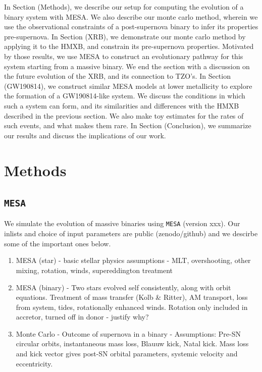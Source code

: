 \documentclass[linenumbers,trackchanges,twocolumn]{aastex701}
\begin{document}
In Section (Methods), we describe our setup for computing the evolution of a binary system with MESA. We also describe our monte carlo method, wherein we use the observational constraints of a post-supernova binary to infer its properties pre-supernova. In Section (XRB), we demonstrate our monte carlo method by applying it to the HMXB, and constrain its pre-supernova properties. Motivated by those results, we use MESA to construct an evolutionary pathway for this system starting from a massive binary. We end the section with a discussion on the future evolution of the XRB, and its connection to TZO's. In Section (GW190814), we construct similar MESA models at lower metallicity to explore the formation of a GW190814-like system. We discuss the conditions in which such a system can form, and its similarities and differences with the HMXB described in the previous section. We also make toy estimates for the rates of such events, and what makes them rare. In Section (Conclusion), we summarize our results and discuss the implications of our work.

\section{Methods} \label{sec:methods}

\subsection{\texttt{MESA}}

We simulate the evolution of massive binaries using \texttt{MESA} (version xxx). Our inlists and choice of input parameters are public (zenodo/github) and we descirbe some of the important ones below.

\begin{enumerate}
    \item MESA (star) - basic stellar physics assumptions - MLT, overshooting, other mixing, rotation, winds, supereddington treatment
    \item MESA (binary) - Two stars evolved self consistently, along with orbit equations. Treatment of mass transfer (Kolb \& Ritter), AM transport, loss from system, tides, rotationally enhanced winds. Rotation only included in accretor, turned off in donor - justify why? 
    \item Monte Carlo - Outcome of supernova in a binary - Assumptions: Pre-SN circular orbits, instantaneous mass loss, Blauuw kick, Natal kick. Mass loss and kick vector gives post-SN orbital parameters, systemic velocity and eccentricity.
\end{enumerate}
\end{document}
